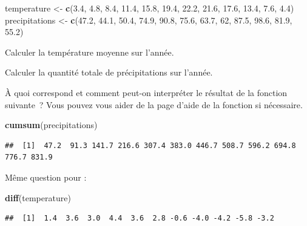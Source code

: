 \documentclass[12pt,]{book}
\newenvironment{Shaded}{\begin{snugshade}}{\end{snugshade}}
\newcommand{\DecValTok}[1]{\textcolor[rgb]{0.00,0.00,0.81}{#1}}
\newcommand{\FloatTok}[1]{\textcolor[rgb]{0.00,0.00,0.81}{#1}}
\newcommand{\KeywordTok}[1]{\textcolor[rgb]{0.13,0.29,0.53}{\textbf{#1}}}
\newcommand{\NormalTok}[1]{#1}
\newcommand{\StringTok}[1]{\textcolor[rgb]{0.31,0.60,0.02}{#1}}
\begin{document}
\begin{Shaded}
\begin{Highlighting}[]
\NormalTok{temperature <-}\StringTok{ }\KeywordTok{c}\NormalTok{(}\FloatTok{3.4}\NormalTok{, }\FloatTok{4.8}\NormalTok{, }\FloatTok{8.4}\NormalTok{, }\FloatTok{11.4}\NormalTok{, }\FloatTok{15.8}\NormalTok{, }\FloatTok{19.4}\NormalTok{, }\FloatTok{22.2}\NormalTok{, }\FloatTok{21.6}\NormalTok{, }\FloatTok{17.6}\NormalTok{, }\FloatTok{13.4}\NormalTok{, }\FloatTok{7.6}\NormalTok{, }\FloatTok{4.4}\NormalTok{)}
\NormalTok{precipitations <-}\StringTok{ }\KeywordTok{c}\NormalTok{(}\FloatTok{47.2}\NormalTok{, }\FloatTok{44.1}\NormalTok{, }\FloatTok{50.4}\NormalTok{, }\FloatTok{74.9}\NormalTok{, }\FloatTok{90.8}\NormalTok{, }\FloatTok{75.6}\NormalTok{, }\FloatTok{63.7}\NormalTok{, }\DecValTok{62}\NormalTok{, }\FloatTok{87.5}\NormalTok{, }\FloatTok{98.6}\NormalTok{, }\FloatTok{81.9}\NormalTok{, }\FloatTok{55.2}\NormalTok{)}
\end{Highlighting}
\end{Shaded}

Calculer la température moyenne sur l'année.

Calculer la quantité totale de précipitations sur l'année.

À quoi correspond et comment peut-on interpréter le résultat de la fonction suivante~? Vous pouvez vous aider de la page d'aide de la fonction si nécessaire.

\begin{Shaded}
\begin{Highlighting}[]
\KeywordTok{cumsum}\NormalTok{(precipitations)}
\end{Highlighting}
\end{Shaded}

\begin{verbatim}
##  [1]  47.2  91.3 141.7 216.6 307.4 383.0 446.7 508.7 596.2 694.8 776.7 831.9
\end{verbatim}

Même question pour :

\begin{Shaded}
\begin{Highlighting}[]
\KeywordTok{diff}\NormalTok{(temperature)}
\end{Highlighting}
\end{Shaded}

\begin{verbatim}
##  [1]  1.4  3.6  3.0  4.4  3.6  2.8 -0.6 -4.0 -4.2 -5.8 -3.2
\end{verbatim}
\end{document}
